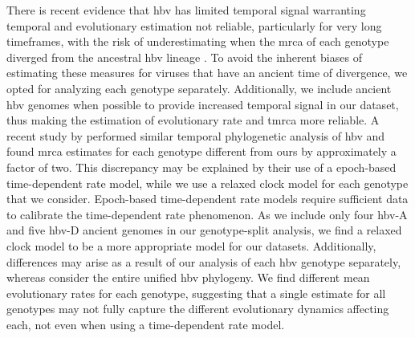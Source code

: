 There is recent evidence that \gls{hbv} has limited temporal signal warranting temporal and evolutionary estimation not reliable, particularly for very long timeframes, with the risk of underestimating when the \gls{mrca} of each genotype diverged from the ancestral \gls{hbv} lineage \citep{ross2018paradox}.
To avoid the inherent biases of estimating these measures for viruses that have an ancient time of divergence, we opted for analyzing each genotype separately.
Additionally, we include ancient \gls{hbv} genomes when possible to provide increased temporal signal in our dataset, thus making the estimation of evolutionary rate and \gls{tmrca} more reliable.
A recent study by \citet{kocher_ten_2021} performed similar temporal phylogenetic analysis of \gls{hbv} and found \gls{mrca} estimates for each genotype different from ours by approximately a factor of two.
This discrepancy may be explained by their use of a epoch-based time-dependent rate model, while we use a relaxed clock model for each genotype that we consider.
Epoch-based time-dependent rate models require sufficient data to calibrate the time-dependent rate phenomenon.
As we include only four \gls{hbv}-A and five \gls{hbv}-D ancient genomes in our genotype-split analysis, we find a relaxed clock model to be a more appropriate model for our datasets.
Additionally, differences may arise as a result of our analysis of each \gls{hbv} genotype separately, whereas \citet{kocher_ten_2021} consider the entire unified \gls{hbv} phylogeny.
We find different mean evolutionary rates for each genotype, suggesting that a single estimate for all genotypes may not fully capture the different evolutionary dynamics affecting each, not even when using a time-dependent rate model.\\

